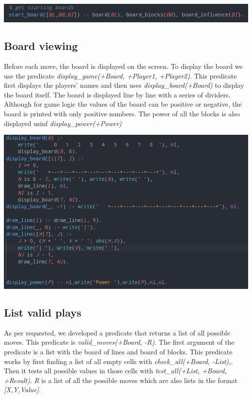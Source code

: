 \documentclass[a4paper]{article}
\begin{document}
\begin{center}
    \includegraphics[scale=0.3]{img/board.png}
\end{center}




\subsection{Board viewing} 
Before each move, the board is displayed on the screen. To display the board we use the predicate \textit{display\_game(+Board, +Player1, +Player2)}. This predicate first displays the players' names and then uses \textit{display\_board(+Board)} to display the board itself. 
The board is displayed line by line with a series of dividers. Although for game logic the values of the board can be positive or negative, the board is printed with only positive numbers.
The power of all the blocks is also displayed usinf \textit{display\_power(+Power)}

\begin{center}
    \includegraphics[scale=0.3]{img/display.png}
\end{center}


\subsection{List valid plays} 
As per requested, we developed a predicate that returns a list of all possible moves. This predicate is \textit{valid\_moves(+Board, -R)}. The first argument of the predicate is a list with the board of lines and board of blocks.
This predicate works by first finding a list of all empty cells with \textit{check\_all(+Board, -List),}. Then it tests all possible values in those cells with \textit{test\_all(+List, +Board, +Result)}.
\textit{R} is a list of all the possible moves which are also lists in the format \textit{[X,Y,Value]}.
\end{document}
